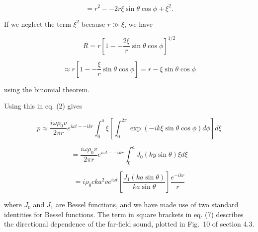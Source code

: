   $$= r^2 -- 2 r \xi \sin \theta \cos \phi +\xi^2 . \tag{3}$$ 

  If we neglect the term $\xi^2$ because $r \gg \xi$, we have 

  $$R = r \left[ 1 -- \dfrac{2\xi}{r} \sin \theta \cos \phi \right]^{1/2}$$ 

  $$\approx r \left[ 1 -- \dfrac{\xi}{r} \sin \theta \cos \phi \right]=r-\xi 
  \sin \theta \cos \phi \tag{4}$$ 

  using the binomial theorem. 

  Using this in eq. (2) gives 

  $$p\approx \dfrac{i \omega \rho_0 v}{2 \pi r} e^{i \omega t -- ikr} 
  \int_0^a{\xi \left[ \int_0^{2 \pi}{\exp(-ik\xi \sin \theta \cos \phi) d \phi} 
  \right] d\xi} \tag{5}$$ 

  $$=\dfrac{i \omega \rho_0 v}{2 \pi r} e^{i \omega t -- ikr} \int_0^a{J_0(ky 
  \sin \theta) \xi d\xi} \tag{6}$$ 

  $$= i \rho_0 c k a^2 v e^{i \omega t} \left[ \dfrac{J_1(ka \sin \theta)}{ka 
  \sin \theta} \right] \dfrac{e^{-ikr}}{r} \tag{7}$$ 

  where $J_0$ and $J_1$ are Bessel functions, and we have made use of two 
  standard identities for Bessel functions. The term in square brackets in eq. 
  (7) describes the directional dependence of the far-field sound, plotted in 
  Fig.\ 10 of section 4.3. 